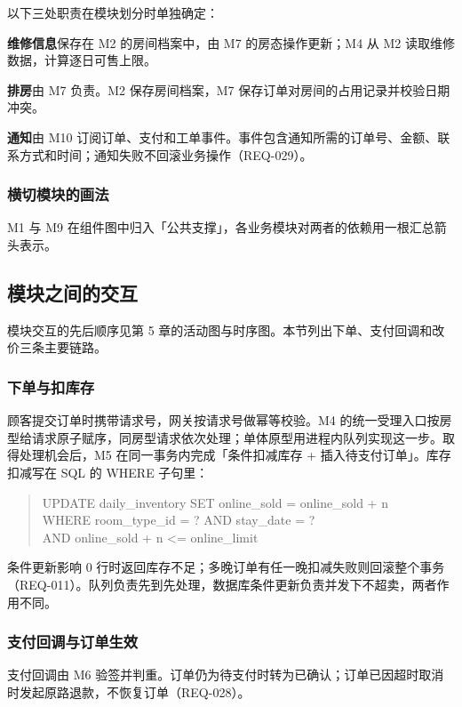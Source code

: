 以下三处职责在模块划分时单独确定：

\textbf{维修信息}保存在 M2 的房间档案中，由 M7 的房态操作更新；M4 从 M2 读取维修数据，计算逐日可售上限。

\textbf{排房}由 M7 负责。M2 保存房间档案，M7 保存订单对房间的占用记录并校验日期冲突。

\textbf{通知}由 M10 订阅订单、支付和工单事件。事件包含通知所需的订单号、金额、联系方式和时间；通知失败不回滚业务操作（REQ-029）。

\subsubsection{横切模块的画法}

M1 与 M9 在组件图中归入「公共支撑」，各业务模块对两者的依赖用一根汇总箭头表示。

\subsection{模块之间的交互}

模块交互的先后顺序见第 5 章的活动图与时序图。本节列出下单、支付回调和改价三条主要链路。

\subsubsection{下单与扣库存}

顾客提交订单时携带请求号，网关按请求号做幂等校验。M4 的统一受理入口按房型给请求原子赋序，同房型请求依次处理；单体原型用进程内队列实现这一步。取得处理机会后，M5 在同一事务内完成「条件扣减库存 + 插入待支付订单」。库存扣减写在 SQL 的 WHERE 子句里：

\begin{quote}
\ttfamily
UPDATE daily\_inventory SET online\_sold = online\_sold + n\\
WHERE room\_type\_id = ? AND stay\_date = ?\\
AND online\_sold + n <= online\_limit
\end{quote}

条件更新影响 0 行时返回库存不足；多晚订单有任一晚扣减失败则回滚整个事务（REQ-011）。队列负责先到先处理，数据库条件更新负责并发下不超卖，两者作用不同。

\subsubsection{支付回调与订单生效}

支付回调由 M6 验签并判重。订单仍为待支付时转为已确认；订单已因超时取消时发起原路退款，不恢复订单（REQ-028）。

